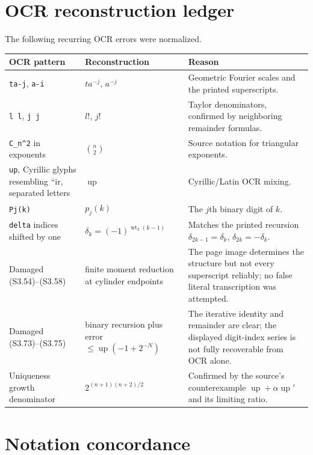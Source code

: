 \documentclass[11pt,oneside]{article}
\theoremstyle{definition}
\theoremstyle{remark}
\newcommand{\Up}{\operatorname{up}}
\newcommand{\wt}{\operatorname{wt}_2}
\begin{document}
\section{OCR reconstruction ledger}
\label{app:ocr}

The following recurring OCR errors were normalized.

\begin{longtable}{@{}p{}p{}p{}@{}}
\toprule
OCR pattern & Reconstruction & Reason\\
\midrule
\endhead
\texttt{ta-j}, \texttt{a-i} & $ta^{-j}$, $a^{-j}$ & Geometric Fourier scales and the printed superscripts.\\
\texttt{l l}, \texttt{j j} & $l!$, $j!$ & Taylor denominators, confirmed by neighboring remainder formulas.\\
\texttt{C\_n\textasciicircum 2} in exponents & $\binom n2$ & Source notation for triangular exponents.\\
\texttt{up}, Cyrillic glyphs resembling ``ir, separated letters & $\Up$ & Cyrillic/Latin OCR mixing.\\
\texttt{Pj(k)} & $p_j(k)$ & The $j$th binary digit of $k$.\\
\texttt{delta} indices shifted by one & $\delta_k=(-1)^{\wt(k-1)}$ & Matches the printed recursion $\delta_{2k-1}=\delta_k$, $\delta_{2k}=-\delta_k$.\\
Damaged (S3.54)--(S3.58) & finite moment reduction at cylinder endpoints & The page image determines the structure but not every superscript reliably; no false literal transcription was attempted.\\
Damaged (S3.73)--(S3.75) & binary recursion plus error $\le\Up(-1+2^{-N})$ & The iterative identity and remainder are clear; the displayed digit-index series is not fully recoverable from OCR alone.\\
Uniqueness growth denominator & $2^{(n+1)(n+2)/2}$ & Confirmed by the source's counterexample $\Up+\alpha\Up'$ and its limiting ratio.\\
\bottomrule
\end{longtable}

\section{Notation concordance}
\label{app:notation}
\end{document}
